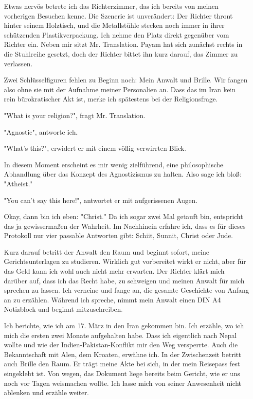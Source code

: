 Etwas nervös betrete ich das Richterzimmer, das ich bereits von meinen vorherigen Besuchen kenne. Die Szenerie ist unverändert: Der Richter thront hinter seinem Holztisch, und die Metallstühle stecken noch immer in ihrer schützenden Plastikverpackung. Ich nehme den Platz direkt gegenüber vom Richter ein. Neben mir sitzt Mr. Translation. Payam hat sich zunächst rechts in die Stuhlreihe gesetzt, doch der Richter bittet ihn kurz darauf, das Zimmer zu verlassen.

Zwei Schlüsselfiguren fehlen zu Beginn noch: Mein Anwalt und Brille. Wir fangen also ohne sie mit der Aufnahme meiner Personalien an. Dass das im Iran kein rein bürokratischer Akt ist, merke ich spätestens bei der Religionsfrage.

"What is your religion?", fragt Mr. Translation.

"Agnostic", antworte ich.

"What's this?", erwidert er mit einem völlig verwirrten Blick.

In diesem Moment erscheint es mir wenig zielführend, eine philosophische Abhandlung über das Konzept des Agnostizismus zu halten. Also sage ich bloß: "Atheist."

"You can't say this here!", antwortet er mit aufgerissenen Augen.

Okay, dann bin ich eben: "Christ." Da ich sogar zwei Mal getauft bin, entspricht das ja gewissermaßen der Wahrheit. Im Nachhinein erfahre ich, dass es für dieses Protokoll nur vier passable Antworten gibt: Schiit, Sunnit, Christ oder Jude.

Kurz darauf betritt der Anwalt den Raum und beginnt sofort, meine Gerichtsunterlagen zu studieren. Wirklich gut vorbereitet wirkt er nicht, aber für das Geld kann ich wohl auch nicht mehr erwarten. Der Richter klärt mich darüber auf, dass ich das Recht habe, zu schweigen und meinen Anwalt für mich sprechen zu lassen. Ich verneine und fange an, die gesamte Geschichte von Anfang an zu erzählen. Während ich spreche, nimmt mein Anwalt einen DIN A4 Notizblock und beginnt mitzuschreiben.

Ich berichte, wie ich am 17. März in den Iran gekommen bin. Ich erzähle, wo ich mich die ersten zwei Monate aufgehalten habe. Dass ich eigentlich nach Nepal wollte und wie der Indien-Pakistan-Konflikt mir den Weg versperrte. Auch die Bekanntschaft mit Alen, dem Kroaten, erwähne ich. In der Zwischenzeit betritt auch Brille den Raum. Er trägt meine Akte bei sich, in der mein Reisepass fest eingeklebt ist. Von wegen, das Dokument liege bereits beim Gericht, wie er uns noch vor Tagen weismachen wollte. Ich lasse mich von seiner Anwesenheit nicht ablenken und erzähle weiter.

